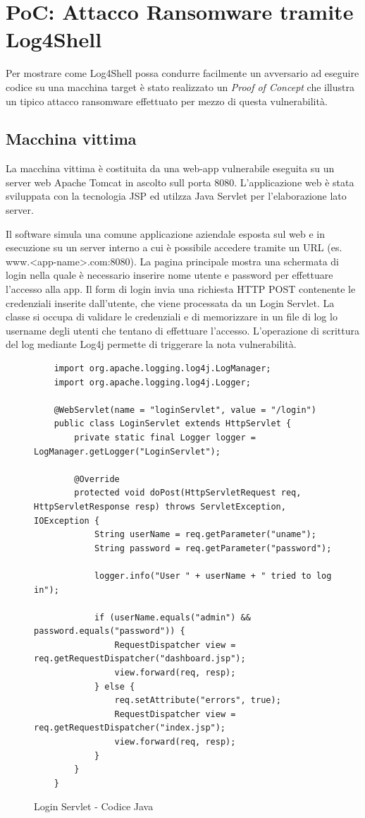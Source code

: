 \documentclass[a4paper, 12pt]{article}
\begin{document}
\newpage

\section{PoC: Attacco Ransomware tramite Log4Shell}
Per mostrare come Log4Shell possa condurre facilmente un avversario ad eseguire codice su una macchina target è stato realizzato un \emph{Proof of Concept} che illustra un tipico attacco ransomware effettuato per mezzo di questa vulnerabilità.


\subsection{Macchina vittima}
La macchina vittima è costituita da una web-app vulnerabile eseguita su un server web Apache Tomcat in ascolto sull porta 8080.
L'applicazione web è stata sviluppata con la tecnologia JSP ed utilzza Java Servlet per l'elaborazione lato server.

Il software simula una comune applicazione aziendale esposta sul web e in esecuzione su un server interno a cui è possibile accedere tramite un URL (es. www.<app-name>.com:8080).
La pagina principale mostra una schermata di login nella quale è necessario inserire nome utente e password per effettuare l'accesso alla app.
Il form di login invia una richiesta HTTP POST contenente le credenziali inserite dall'utente, che viene processata da un Login Servlet. La classe si occupa di validare le credenziali e di memorizzare in un file di log lo username degli utenti che tentano di effettuare l'accesso.
L'operazione di scrittura del log mediante Log4j permette di triggerare la nota vulnerabilità.

\begin{figure}
    \centering
    \begin{lstlisting}
    import org.apache.logging.log4j.LogManager;
    import org.apache.logging.log4j.Logger;
    
    @WebServlet(name = "loginServlet", value = "/login")
    public class LoginServlet extends HttpServlet {
        private static final Logger logger = LogManager.getLogger("LoginServlet");
    
        @Override
        protected void doPost(HttpServletRequest req, HttpServletResponse resp) throws ServletException, IOException {
            String userName = req.getParameter("uname");
            String password = req.getParameter("password");
    
            logger.info("User " + userName + " tried to log in");
    
            if (userName.equals("admin") && password.equals("password")) {
                RequestDispatcher view = req.getRequestDispatcher("dashboard.jsp");
                view.forward(req, resp);
            } else {
                req.setAttribute("errors", true);
                RequestDispatcher view = req.getRequestDispatcher("index.jsp");
                view.forward(req, resp);
            }
        }
    }
\end{lstlisting}
    \caption{Login Servlet - Codice Java}
    \label{fig:loginservlet}
\end{figure}
\end{document}
